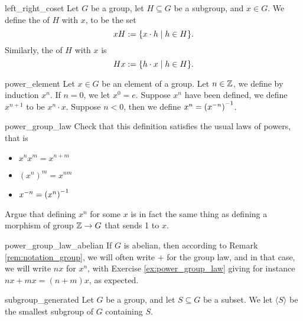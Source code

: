 \begin{cdef}{}{left_right_coset}
    Let \( G \) be a group, let \( H \subseteq G \) be a subgroup, and \( x \in G \). We define the  of \( H \) with \( x \), to be the set
    \begin{equation*}
        x H := \{ x \cdot h \mid h \in H \}.
    \end{equation*}
    Similarly, the  of \( H \) with \( x \) is
    \begin{equation*}
        H x := \{ h \cdot x \mid h \in H \}.
    \end{equation*}
\end{cdef}

\begin{cdef}{}{power_element}
    Let \( x \in G \) be an element of a group. Let \( n \in \mathbb{Z} \), we define by induction \( x^n \). If \( n = 0 \), we let \( x^0 = e \). Suppose \( x^n \) have been defined, we define \( x^{n + 1} \) to be \( x^n \cdot x \). Suppose \( n < 0 \), then we define \( x^n = {(x^{-n})}^{-1} \).
\end{cdef}

\begin{cex}{}{power_group_law}
    Check that this definition satisfies the usual laws of powers, that is
    \begin{itemize}
        \item \( x^n x^m = x^{n + m} \)
        \item \( (x^n)^m = x^{nm} \)
        \item \( x^{-n} = {(x^n)}^{-1}\)
    \end{itemize}
    Argue that defining \( x^n \) for some \( x \) is in fact the same thing as defining a morphism of group \( \mathbb{Z} \to G \) that sends 1 to \( x \).
\end{cex}

\begin{crem}{}{power_group_law_abelian}
    If \( G \) is abelian, then according to Remark \ref*{rem:notation_group}, we will often write \( + \) for the group law, and in that case, we will write \( nx \) for \( x^n \), with Exercise \ref{ex:power_group_law} giving for instance \( nx + mx = (n + m)x \), as expected.
\end{crem}


\begin{cdef}{}{subgroup_generated}
    Let \( G \) be a group, and let \( S \subseteq G \) be a subset. We let \( \langle S \rangle \) be the smallest subgroup of \( G \) containing \( S \).
\end{cdef}

